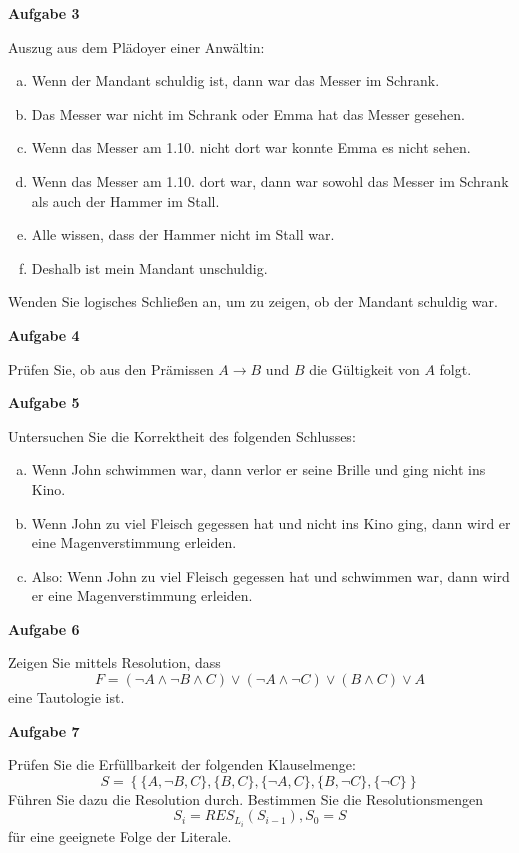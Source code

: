 \documentclass[a4paper,12pt]{article}
\newcommand{\Aufgabe}[1]{
	{
		\vspace*{0.5cm}
		\textsf{\textbf{Aufgabe #1}}
		\vspace*{0.2cm}
		
	}
}
\begin{document}
	\Aufgabe{3}
	Auszug aus dem Plädoyer einer Anwältin:
	\begin{enumerate}[a.]
		\item Wenn der Mandant schuldig ist, dann war das Messer im Schrank.
		\item Das Messer war nicht im Schrank oder Emma hat das Messer gesehen.
		\item Wenn das Messer am 1.10. nicht dort war konnte Emma es nicht sehen.
		\item Wenn das Messer am 1.10. dort war, dann war sowohl das Messer im Schrank als auch der Hammer im Stall.
		\item Alle wissen, dass der Hammer nicht im Stall war.
		\item Deshalb ist mein Mandant unschuldig.
	\end{enumerate}
	Wenden Sie logisches Schließen an, um zu zeigen, ob der Mandant schuldig war.
	
	\Aufgabe{4}
	Prüfen Sie, ob aus den Prämissen $A \rightarrow B$ und $B$ die Gültigkeit von $A$ folgt.
	
	\Aufgabe{5}
	Untersuchen Sie die Korrektheit des folgenden Schlusses:
	\begin{enumerate}[a.]
		\item Wenn John schwimmen war, dann verlor er seine Brille und ging nicht ins Kino.
		\item Wenn John zu viel Fleisch gegessen hat und nicht ins Kino ging, dann wird er eine Magenverstimmung erleiden.
		\item Also: Wenn John zu viel Fleisch gegessen hat und schwimmen war, dann wird er eine Magenverstimmung erleiden.
	\end{enumerate}

	\Aufgabe{6}
	Zeigen Sie mittels Resolution, dass
	$$F=(\neg A \land \neg B \land C) \lor (\neg A \land \neg C) \lor (B \land C) \lor A$$
	eine Tautologie ist.
	
	\Aufgabe{7}
	Prüfen Sie die Erfüllbarkeit der folgenden Klauselmenge:
	$$S = \left\{\{A, \neg B, C\}, \{B, C\}, \{\neg A, C\}, \{B, \neg C\}, \{\neg C\}\right\}$$
	Führen Sie dazu die Resolution durch. Bestimmen Sie die Resolutionsmengen $$S_i=RES_{L_i}(S_{i-1}), S_0=S$$ für eine geeignete Folge der Literale.
\end{document}
